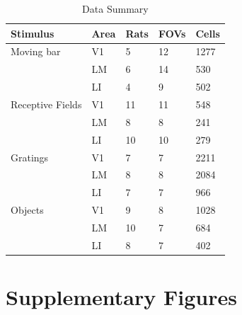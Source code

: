 \begin{table}[h]
  \caption{Data Summary}
  \centering
  \begin{tabular}{lllll}
    \toprule
    Stimulus & Area & Rats & FOVs & Cells   \\
    \midrule
    Moving bar & V1  & 5 & 12 & 1277        \\
               & LM  & 6 & 14 & 530         \\
               & LI  & 4 & 9 & 502          \\
    \midrule
    Receptive Fields & V1  & 11 & 11 & 548  \\
                     & LM  & 8 & 8 & 241   \\
                     & LI  & 10 & 10 & 279    \\
    \midrule
    Gratings & V1  & 7 & 7 & 2211     \\
             & LM  & 8 & 8 & 2084     \\
             & LI  & 7 & 7 & 966     \\
    \midrule
    Objects  & V1  & 9 & 8 & 1028   \\
             & LM  & 10 & 7 & 684   \\
             & LI  & 8 & 7 & 402    \\
    \bottomrule
  \end{tabular}
  \label{tab:data_counts}
\end{table}




\section{Supplementary Figures}

